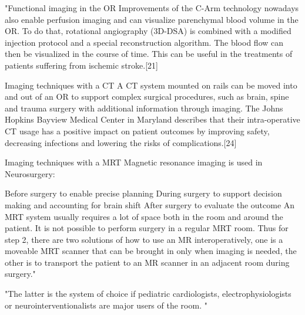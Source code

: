 	"Functional imaging in the OR
	Improvements of the C-Arm technology nowadays also enable perfusion imaging and can visualize parenchymal blood volume in the OR. To do that, rotational angiography (3D-DSA) is combined with a modified injection protocol and a special reconstruction algorithm. The blood flow can then be visualized in the course of time. This can be useful in the treatments of patients suffering from ischemic stroke.[21]

	Imaging techniques with a CT
	A CT system mounted on rails can be moved into and out of an OR to support complex surgical procedures, such as brain, spine and trauma surgery with additional information through imaging. The Johns Hopkins Bayview Medical Center in Maryland describes that their intra-operative CT usage has a positive impact on patient outcomes by improving safety, decreasing infections and lowering the risks of complications.[24]

	Imaging techniques with a MRT
	Magnetic resonance imaging is used in Neurosurgery:

	Before surgery to enable precise planning
	During surgery to support decision making and accounting for brain shift
	After surgery to evaluate the outcome
	An MRT system usually requires a lot of space both in the room and around the patient. It is not possible to perform surgery in a regular MRT room. Thus for step 2, there are two solutions of how to use an MR interoperatively, one is a moveable MRT scanner that can be brought in only when imaging is needed, the other is to transport the patient to an MR scanner in an adjacent room during surgery."

	"The latter is the system of choice if pediatric cardiologists, electrophysiologists or neurointerventionalists are major users of the room. "

